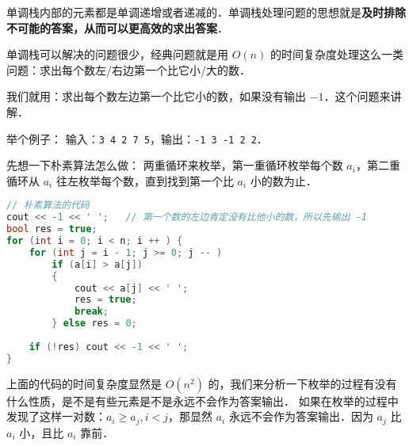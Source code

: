 

单调栈内部的元素都是单调递增或者递减的．单调栈处理问题的思想就是\textbf{及时排除不可能的答案，从而可以更高效的求出答案}．

单调栈可以解决的问题很少，经典问题就是用 $O(n)$ 的时间复杂度处理这么一类问题：求出每个数左/右边第一个比它小/大的数．

我们就用：求出每个数左边第一个比它小的数，如果没有输出 $-1$．这个问题来讲解．

举个例子：
输入：\verb|3 4 2 7 5|，输出：\verb|-1 3 -1 2 2|．

先想一下朴素算法怎么做：
两重循环来枚举，第一重循环枚举每个数 $a_i$，第二重循环从 $a_i$ 往左枚举每个数，直到找到第一个比 $a_i$ 小的数为止．

\begin{lstlisting}[language=cpp]
// 朴素算法的代码
cout << -1 << ' ';   // 第一个数的左边肯定没有比他小的数，所以先输出 -1
bool res = true;
for (int i = 0; i < n; i ++ ) {
    for (int j = i - 1; j >= 0; j -- )
        if (a[i] > a[j])
        {
            cout << a[j] << ' ';
            res = true;
            break;
        } else res = 0;
    
    if (!res) cout << -1 << ' ';
}
\end{lstlisting}

上面的代码的时间复杂度显然是 $O(n^2)$ 的，我们来分析一下枚举的过程有没有什么性质，是不是有些元素是不是永远不会作为答案输出．
如果在枚举的过程中发现了这样一对数：$a_i \geqslant a_j, i < j$，那显然 $a_i$ 永远不会作为答案输出．因为 $a_j$ 比 $a_i$ 小，且比 $a_i$ 靠前．